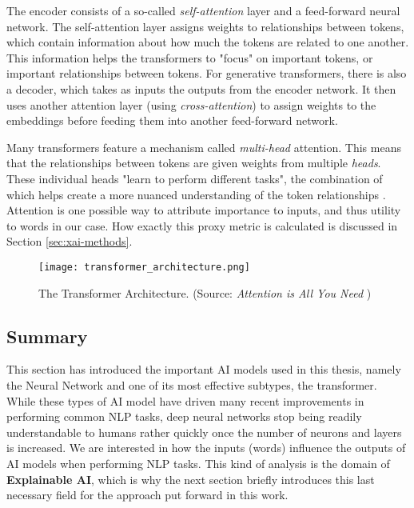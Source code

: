 The encoder consists of a so-called \textit{self-attention} layer and a feed-forward neural network.
The self-attention layer assigns weights to relationships between tokens, which contain information about how much the tokens are related to one another.
This information helps the transformers to "focus" on important tokens, or important relationships between tokens.
For generative transformers, there is also a decoder, which takes as inputs the outputs from the encoder network.
It then uses another attention layer (using \textit{cross-attention}) to assign weights to the embeddings before feeding them into another feed-forward network.

Many transformers feature a mechanism called \textit{multi-head} attention.
This means that the relationships between tokens are given weights from multiple \textit{heads}.
These individual heads "learn to perform different tasks", the combination of which helps create a more nuanced understanding of the token relationships \cite{vaswani2017attention}.
Attention is one possible way to attribute importance to inputs, and thus utility to words in our case.
How exactly this proxy metric is calculated is discussed in Section \ref{sec:xai-methods}.


\begin{figure}[H]
	\centering
	\texttt{[image: transformer\_architecture.png]}
	\caption{The Transformer Architecture. (Source: \textit{Attention is All You Need} \cite{vaswani2017attention})}
	\label{fig:transformer-architecture}
\end{figure}



\subsection{Summary}
This section has introduced the important AI models used in this thesis, namely the Neural Network and one of its most effective subtypes, the transformer.
While these types of AI model have driven many recent improvements in performing common NLP tasks, deep neural networks stop being readily understandable to humans rather quickly once the number of neurons and layers is increased.
We are interested in how the inputs (words) influence the outputs of AI models when performing NLP tasks.
This kind of analysis is the domain of \textbf{Explainable AI}, which is why the next section briefly introduces this last necessary field for the approach put forward in this work.

